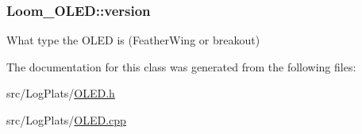 \subsubsection[{\texorpdfstring{version}{version}}]{ Loom\+\_\+\+O\+L\+E\+D\+::version\hspace{0.3cm}{\ttfamily [protected]}}\hypertarget{class_loom___o_l_e_d_af0bc56c14688195fed9cafb74601bec3}{}\label{class_loom___o_l_e_d_af0bc56c14688195fed9cafb74601bec3}


What type the O\+L\+ED is (Feather\+Wing or breakout) 



The documentation for this class was generated from the following files\+:\begin{DoxyCompactItemize}
\item 
src/\+Log\+Plats/\hyperlink{_o_l_e_d_8h}{O\+L\+E\+D.\+h}\item 
src/\+Log\+Plats/\hyperlink{_o_l_e_d_8cpp}{O\+L\+E\+D.\+cpp}\end{DoxyCompactItemize}
